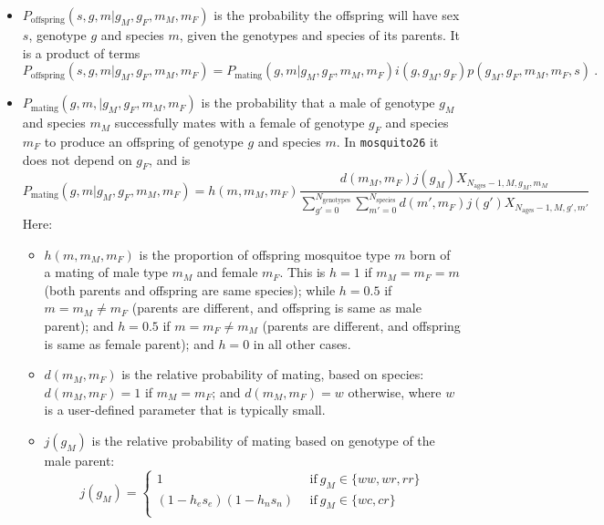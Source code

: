 \documentclass[11pt,a4paper]{article}
\begin{document}
\begin{itemize}
\item $P_{\mathrm{offspring}}(s, g, m | g_{M}, g_{F}, m_{M}, m_{F})$ is the probability the offspring will have sex $s$, genotype $g$ and species $m$, given the genotypes and species of its parents.  It is a product of terms
\begin{equation}
P_{\mathrm{offspring}}(s, g, m | g_{M}, g_{F}, m_{M}, m_{F}) = P_{\mathrm{mating}}(g, m | g_{M}, g_{F}, m_{M}, m_{F}) i(g, g_{M}, g_{F})p(g_{M}, g_{F}, m_{M}, m_{F}, s) \ .
\end{equation}
\item $P_{\mathrm{mating}}(g, m, | g_{M}, g_{F}, m_{M}, m_{F})$ is the probability that a male of genotype $g_{M}$ and species $m_{M}$ successfully mates with a female of genotype $g_{F}$ and species $m_{F}$ to produce an offspring of genotype $g$ and species $m$.  In {\tt mosquito26} it does not depend on $g_{F}$, and is
  \begin{equation}
    P_{\mathrm{mating}}(g, m | g_{M}, g_{F}, m_{M}, m_{F}) = h(m, m_{M}, m_{F})\frac{d(m_{M}, m_{F})j(g_{M}) X_{N_{\mathrm{ages}} - 1, M, g_{M}, m_{M}}}{\sum_{g'=0}^{N_{\mathrm{genotypes}}}\sum_{m'=0}^{N_{\mathrm{species}}}d(m', m_{F})j(g') X_{N_{\mathrm{ages}} - 1, M, g', m'}}
  \end{equation}
  Here:
  \begin{itemize}
  \item $h(m, m_{M}, m_{F})$ is the proportion of offspring mosquitoe type $m$ born of a mating of male type $m_{M}$ and female $m_{F}$.  This is $h = 1$ if $m_{M}=m_{F}=m$ (both parents and offspring are same species); while $h=0.5$ if $m = m_{M}\neq m_{F}$ (parents are different, and offspring is same as male parent); and $h=0.5$ if $m = m_{F} \neq m_{M}$ (parents are different, and offspring is same as female parent); and $h=0$ in all other cases.
  \item $d(m_{M}, m_{F})$ is the relative probability of mating, based on species: $d(m_{M}, m_{F}) = 1$ if $m_{M} = m_{F}$; and $d(m_{M}, m_{F}) = w$ otherwise, where $w$ is a user-defined parameter that is typically small.
  \item $j(g_{M})$ is the relative probability of mating based on genotype of the male parent:
    \begin{equation}
      j(g_{M}) = \left\{
      \begin{array}{ll}
        1 & \ \ \mbox{if}\ g_{M}\in\{ww, wr, rr\} \\
        (1 - h_{e}s_{e})(1 - h_{n}s_{n}) & \ \ \mbox{if}\ g_{M}\in\{wc, cr\} \\

\end{array}
\end{equation}
\end{itemize}
\end{itemize}
\end{document}

